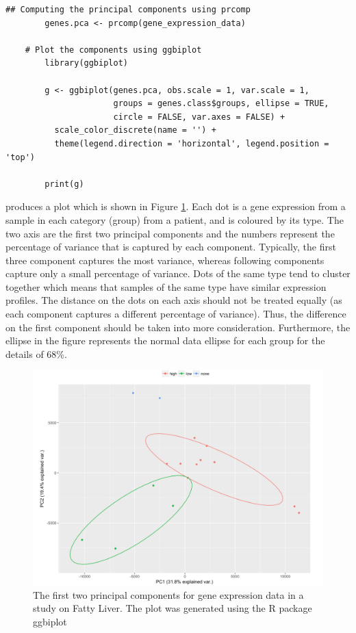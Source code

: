 \documentclass[11pt, oneside]{article}   	%
\begin{document}
\begin{framed}
\begin{verbatim}
## Computing the principal components using prcomp
        genes.pca <- prcomp(gene_expression_data)
        
	# Plot the components using ggbiplot
        library(ggbiplot)
        
        g <- ggbiplot(genes.pca, obs.scale = 1, var.scale = 1,
                      groups = genes.class$groups, ellipse = TRUE,
                      circle = FALSE, var.axes = FALSE) +
          scale_color_discrete(name = '') +
          theme(legend.direction = 'horizontal', legend.position = 'top')
        
        print(g)
\end{verbatim}
\end{framed}


 produces a plot which is shown in Figure \ref{fig:PCAFattyLiver}.
Each dot is a gene expression from a sample in each category (group) from a patient, and is coloured by its type.
The two axis are the first two principal components and the numbers represent the percentage of variance that is captured by each component. Typically, the first three component captures the most variance, whereas following components capture only a small percentage of variance.
Dots of the same type tend to cluster together which means that samples of the same type have similar expression profiles.
The distance on the dots on each axis should not be treated equally (as each component captures a different percentage of variance). Thus, the difference on the first component should be taken into more consideration.
Furthermore, the ellipse in the figure represents the normal data ellipse for each group for the details of 68\%. 

\begin{figure}[!ht]
	\includegraphics[width=\textwidth]{example2-first2components-fattyLiverData}
	\caption{The first two principal components for gene expression data in a study on Fatty Liver. The plot was generated using the R package ggbiplot \cite{Vu2016}}
	\label{fig:PCAFattyLiver}
\end{figure}
\end{document}

